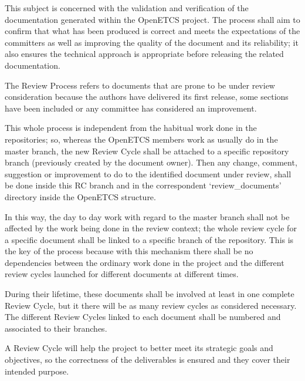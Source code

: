 \documentclass{template/openetcs_article}
\begin{document}

This subject is concerned with the validation and verification of the documentation generated within the OpenETCS project.  The process shall aim to confirm that what has been produced is correct and meets the expectations of the committers as well as improving the quality of the document and its reliability; it also ensures the technical approach is appropriate before releasing the related documentation.

The Review Process refers to documents that are prone to be under review consideration because the authors have delivered its first release, some sections have been included or any committee has considered an improvement. 

This whole process is independent from the habitual work done in the repositories; so, whereas the OpenETCS members work as usually do in the master branch, the new Review Cycle shall be attached to a specific repository branch (previously created by the document owner). Then any change, comment, suggestion or improvement to do to the identified document under review, shall be done inside this RC branch and in the correspondent ‘review\_documents’ directory inside the OpenETCS structure. 

In this way, the day to day work with regard to the master branch shall not be affected by the work being done in the review context; the whole review cycle for a specific document shall be linked to a specific branch of the repository. 
This is the key of the process because with this mechanism there shall be no dependencies between the ordinary work done in the project and the different review cycles launched for different documents at different times.

During their lifetime, these documents shall be involved at least in one complete Review Cycle, but it there will be as many review cycles as considered necessary. The different Review Cycles linked to each document shall be numbered and associated to their branches.   

A Review Cycle will help the project to better meet its strategic goals and objectives, so the correctness of the deliverables is ensured and they cover their intended purpose.
\end{document}
